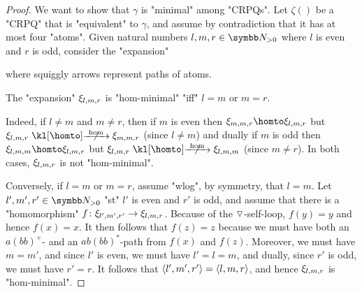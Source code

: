 \begin{proof}
	We want to show that $\gamma$ is "minimal" among "CRPQs".
	Let $\zeta()$ be a "CRPQ" that is "equivalent" to $\gamma$, and assume by contradiction
	that it has at most four "atoms".
	Given natural numbers $l,m,r \in \Np$ where $l$ is even and $r$ is odd,
	consider the "expansion"
	\begin{center}
		\small
	\end{center}
	where squiggly arrows represent paths of atoms.
	\begin{claim}
		\AP\label{claim:example-union-matter-1}
		The "expansion" $\xi_{l,m,r}$ is "hom-minimal" "iff" $l = m$ or $m=r$.
	\end{claim}
	Indeed, if $l \neq m$ and $m \neq r$, then
	if $m$ is even then $\anexpansion_{m,m,r} \homto \anexpansion_{l,m,r}$
	but $\anexpansion_{l,m,r} \nothomto \anexpansion_{m,m,r}$ (since $l \neq m$)
	and dually if $m$ is odd then $\anexpansion_{l,m,m} \homto \anexpansion_{l,m,r}$
	but $\anexpansion_{l,m,r} \nothomto \anexpansion_{l,m,m}$ (since $m \neq r$).
	In both cases, $\xi_{l,m,r}$ is not "hom-minimal".
	
	Conversely, if $l = m$ or $m=r$, assume "wlog", by symmetry, that $l=m$.
	Let $l',m',r' \in \Np$ "st" $l'$ is even and $r'$ is odd,
	and assume that there is a "homomorphism" $f\colon \xi_{l',m',r'} \to \xi_{l,m,r}$. Because of the $\triangledown$-self-loop, $f(y) = y$ and hence $f(x) = x$. It then follows that
	$f(z) = z$ because we must have both an $a(bb)^+$- and an $ab(bb)^*$-path
	from $f(x)$ and $f(z)$. 
	Moreover, we must have $m=m'$,
	and since $l'$ is even, we must have $l' = l = m$,
	and dually, since $r'$ is odd, we must have $r' = r$.
	It follows that $\langle l',m',r'\rangle = \langle l,m,r\rangle$, and hence $\xi_{l,m,r}$ is "hom-minimal".


\end{proof}

